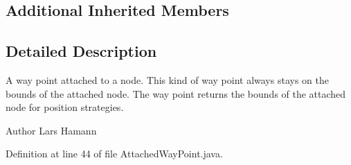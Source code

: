 \subsection*{Additional Inherited Members}


\subsection{Detailed Description}
A way point attached to a node. This kind of way point always stays on the bounds of the attached node. The way point returns the bounds of the attached node for position strategies.

\begin{DoxyAuthor}{Author}
Lars Hamann 
\end{DoxyAuthor}


Definition at line 44 of file Attached\-Way\-Point.\-java.



